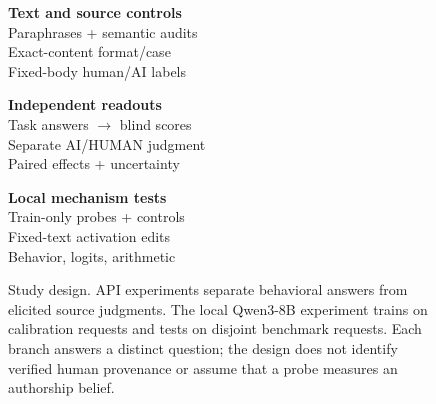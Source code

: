 \begin{figure}[t]
\centering
\setlength{\fboxsep}{6pt}
\par\smallskip
\begin{minipage}[t]{0.32\textwidth}\centering
\textbf{Text and source controls}\\[3pt]
\small Paraphrases + semantic audits\\
Exact-content format/case\\
Fixed-body human/AI labels
\end{minipage}\hfill
\begin{minipage}[t]{0.32\textwidth}\centering
\textbf{Independent readouts}\\[3pt]
\small Task answers $\to$ blind scores\\
Separate AI/HUMAN judgment\\
Paired effects + uncertainty
\end{minipage}\hfill
\begin{minipage}[t]{0.32\textwidth}\centering
\textbf{Local mechanism tests}\\[3pt]
\small Train-only probes + controls\\
Fixed-text activation edits\\
Behavior, logits, arithmetic
\end{minipage}
\caption{Study design. API experiments separate behavioral answers from elicited source judgments. The local Qwen3-8B experiment trains on calibration requests and tests on disjoint benchmark requests. Each branch answers a distinct question; the design does not identify verified human provenance or assume that a probe measures an authorship belief.}
\label{fig:method}
\end{figure}
